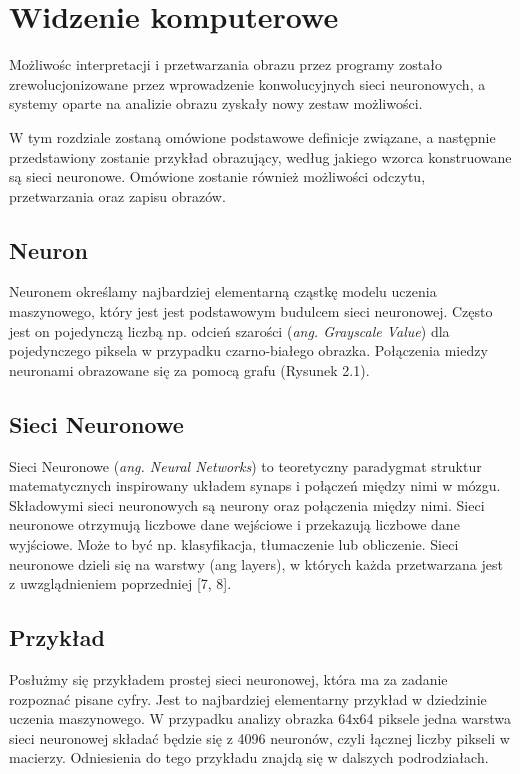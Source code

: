 \documentclass[brudnopis]{xmgr}
\begin{document}
	


\chapter{Widzenie komputerowe  }

Możliwośc interpretacji i przetwarzania obrazu przez programy zostało zrewolucjonizowane
przez wprowadzenie konwolucyjnych sieci neuronowych, a systemy oparte na analizie obrazu zyskały nowy zestaw możliwości. 

W tym rozdziale zostaną omówione podstawowe definicje związane, a następnie przedstawiony zostanie przykład obrazujący, według jakiego wzorca konstruowane są sieci neuronowe. Omówione zostanie również 
możliwości odczytu, przetwarzania oraz zapisu obrazów.

\section{Neuron  \label{s:dsssl}}

Neuronem określamy najbardziej elementarną cząstkę modelu uczenia maszynowego, który jest jest podstawowym budulcem sieci neuronowej. Często jest on pojedynczą liczbą np. odcień szarości (\textit{ang. Grayscale Value}) dla pojedynczego piksela w przypadku czarno-białego obrazka. Połączenia miedzy neuronami obrazowane się za pomocą grafu (Rysunek 2.1).

\section{Sieci Neuronowe   \label{s:dsssl}}

Sieci Neuronowe (\textit{ang. Neural Networks}) to teoretyczny paradygmat struktur matematycznych inspirowany układem synaps i połączeń między nimi w mózgu. Składowymi sieci neuronowych są neurony oraz połączenia między nimi. Sieci neuronowe otrzymują liczbowe dane wejściowe i przekazują liczbowe dane wyjściowe. Może to być np. klasyfikacja, tłumaczenie lub obliczenie. Sieci neuronowe dzieli się na warstwy (ang layers), w których każda przetwarzana jest z uwzglądnieniem poprzedniej [7, 8].



\section{Przykład  \label{s:dsssl}}

Posłużmy się przykładem prostej sieci neuronowej, która ma za zadanie rozpoznać pisane cyfry. Jest to najbardziej elementarny przykład w dziedzinie uczenia maszynowego.
W przypadku analizy obrazka 64x64 piksele jedna warstwa sieci neuronowej składać będzie się z 4096 neuronów, czyli łącznej liczby pikseli w macierzy. Odniesienia do tego przykładu znajdą się w dalszych podrodziałach.
\end{document}
